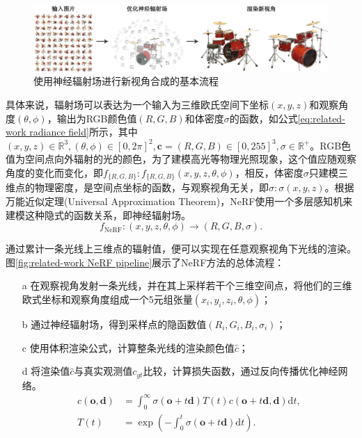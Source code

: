 \begin{figure}[ht]
    \centering
    \includegraphics[width=\textwidth]{undergraduate-thesis/images/related-work/NeRF setting.pdf}
    \caption{使用神经辐射场\cite{mildenhall_nerf_2020}进行新视角合成的基本流程}
    \label{fig:related-work novel-view-synthesis-task}
\end{figure}

具体来说，辐射场可以表达为一个输入为三维欧氏空间下坐标$(x,y,z)$和观察角度$(\theta,\phi)$，输出为RGB颜色值$(R,G,B)$和体密度$\sigma$的函数，如公式\ref{eq:related-work radiance field}所示，其中$(x,y,z)\in\mathbb{R}^3, (\theta,\phi)\in[0, 2\pi]^2, \mathbf{c}=(R,G,B)\in[0,255]^3, \sigma\in\mathbb{R}^+$。RGB色值为空间点向外辐射的光的颜色，为了建模高光等物理光照现象，这个值应随观察角度的变化而变化，即$f_{\{R,G,B\}}:f_{\{R,G,B\}}(x,y,z,\theta,\phi)$，相反，体密度$\sigma$只建模三维点的物理密度，是空间点坐标的函数，与观察视角无关，即$\sigma:\sigma(x,y,z)$。根据万能近似定理\cite{hornik_multilayer_1989}(Universal Approximation Theorem)，NeRF使用一个多层感知机来建模这种隐式的函数关系，即神经辐射场。
\begin{equation}
    f_\text{NeRF}: (x,y,z,\theta,\phi)\to(R,G,B,\sigma).
    \label{eq:related-work radiance field}
\end{equation}

通过累计一条光线上三维点的辐射值，便可以实现在任意观察视角下光线的渲染。图\ref{fig:related-work NeRF pipeline}展示了NeRF方法的总体流程：
\begin{enumerate}
    \item [a] 在观察视角发射一条光线，并在其上采样若干个三维空间点，将他们的三维欧式坐标和观察角度组成一个5元组张量$(x_i,y_i,z_i,\theta,\phi)$；
    \item [b] 通过神经辐射场，得到采样点的隐函数值$(R_i,G_i,B_i,\sigma_i)$；
    \item [c] 使用体积渲染公式，计算整条光线的渲染颜色值$\hat{c}$；
    \item [d] 将渲染值$\hat{c}$与真实观测值${c}_{gt}$比较，计算损失函数，通过反向传播优化神经网络。
    \begin{align}
    c(\mathbf{o},\mathbf{d}) &= \int_0^\infty \sigma(\mathbf{o}+t\mathbf{d})T(t)c(\mathbf{o}+t\mathbf{d},\mathbf{d})\text{d}t,\label{eq: related-work volume rendering}
    \\
    T(t) &= \exp(-\int_0^t\sigma(\mathbf{o}+t\mathbf{d})\text{d}t).\label{eq: related-work transmittance}
    \end{align}
\end{enumerate}


